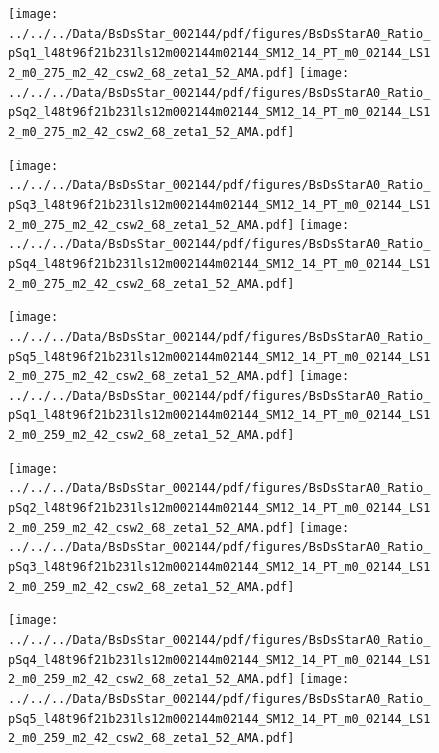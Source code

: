 \documentclass[a4paper,10pt]{article}
\begin{document}
\begin{figure}[p]
 \texttt{[image: ../../../Data/BsDsStar\_002144/pdf/figures/BsDsStarA0\_Ratio\_pSq1\_l48t96f21b231ls12m002144m02144\_SM12\_14\_PT\_m0\_02144\_LS12\_m0\_275\_m2\_42\_csw2\_68\_zeta1\_52\_AMA.pdf]} 
 \texttt{[image: ../../../Data/BsDsStar\_002144/pdf/figures/BsDsStarA0\_Ratio\_pSq2\_l48t96f21b231ls12m002144m02144\_SM12\_14\_PT\_m0\_02144\_LS12\_m0\_275\_m2\_42\_csw2\_68\_zeta1\_52\_AMA.pdf]} 
 \end{figure}
\begin{figure}[p]
 \texttt{[image: ../../../Data/BsDsStar\_002144/pdf/figures/BsDsStarA0\_Ratio\_pSq3\_l48t96f21b231ls12m002144m02144\_SM12\_14\_PT\_m0\_02144\_LS12\_m0\_275\_m2\_42\_csw2\_68\_zeta1\_52\_AMA.pdf]} 
 \texttt{[image: ../../../Data/BsDsStar\_002144/pdf/figures/BsDsStarA0\_Ratio\_pSq4\_l48t96f21b231ls12m002144m02144\_SM12\_14\_PT\_m0\_02144\_LS12\_m0\_275\_m2\_42\_csw2\_68\_zeta1\_52\_AMA.pdf]} 
 \end{figure}
\begin{figure}[p]
 \texttt{[image: ../../../Data/BsDsStar\_002144/pdf/figures/BsDsStarA0\_Ratio\_pSq5\_l48t96f21b231ls12m002144m02144\_SM12\_14\_PT\_m0\_02144\_LS12\_m0\_275\_m2\_42\_csw2\_68\_zeta1\_52\_AMA.pdf]} 
 \texttt{[image: ../../../Data/BsDsStar\_002144/pdf/figures/BsDsStarA0\_Ratio\_pSq1\_l48t96f21b231ls12m002144m02144\_SM12\_14\_PT\_m0\_02144\_LS12\_m0\_259\_m2\_42\_csw2\_68\_zeta1\_52\_AMA.pdf]} 
 \end{figure}
\clearpage
\begin{figure}[p]
 \texttt{[image: ../../../Data/BsDsStar\_002144/pdf/figures/BsDsStarA0\_Ratio\_pSq2\_l48t96f21b231ls12m002144m02144\_SM12\_14\_PT\_m0\_02144\_LS12\_m0\_259\_m2\_42\_csw2\_68\_zeta1\_52\_AMA.pdf]} 
 \texttt{[image: ../../../Data/BsDsStar\_002144/pdf/figures/BsDsStarA0\_Ratio\_pSq3\_l48t96f21b231ls12m002144m02144\_SM12\_14\_PT\_m0\_02144\_LS12\_m0\_259\_m2\_42\_csw2\_68\_zeta1\_52\_AMA.pdf]} 
 \end{figure}
\begin{figure}[p]
 \texttt{[image: ../../../Data/BsDsStar\_002144/pdf/figures/BsDsStarA0\_Ratio\_pSq4\_l48t96f21b231ls12m002144m02144\_SM12\_14\_PT\_m0\_02144\_LS12\_m0\_259\_m2\_42\_csw2\_68\_zeta1\_52\_AMA.pdf]} 
 \texttt{[image: ../../../Data/BsDsStar\_002144/pdf/figures/BsDsStarA0\_Ratio\_pSq5\_l48t96f21b231ls12m002144m02144\_SM12\_14\_PT\_m0\_02144\_LS12\_m0\_259\_m2\_42\_csw2\_68\_zeta1\_52\_AMA.pdf]} 
 \end{figure}
\clearpage
\end{document}
